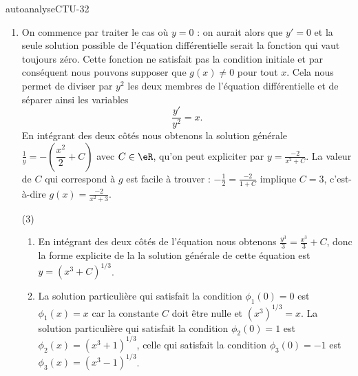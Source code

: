 \begin{corrige}{autoanalyseCTU-32}
\begin{enumerate}
\item On commence par traiter le cas où $y = 0$ : on aurait alors que $y' = 0$ et la seule solution possible de l'équation différentielle serait la fonction qui vaut toujours zéro. Cette fonction ne satisfait pas la condition initiale et par conséquent nous pouvons supposer que $g(x)\neq 0$ pour tout $x$. Cela nous permet de diviser par $y^2$ les deux membres de l'équation différentielle et de séparer ainsi les variables\[
\frac{y'}{y^2} = x. 
\] 
En intégrant des deux c\^otés nous obtenons la solution générale  $\frac{1}{y} =- \left(\dfrac{x^2}{2} + C\right)$ avec $C\in\eR$, qu'on peut expliciter par $y = \frac{-2}{x^2 + C}$. La valeur de $C$ qui correspond à $g$ est facile à trouver : $ -\frac{1}{2} =  \frac{-2}{1 + C}$ implique $C=3$, c'est-à-dire $g(x) = \frac{-2}{x^2 + 3}$.
\item[(3)]
  \begin{enumerate}
  \item En intégrant des deux c\^otés de l'équation nous obtenons  $\displaystyle \frac{y^3}{3}=\frac{x^3}{3}+C$, donc la forme explicite de la la solution générale de cette équation est $\displaystyle y=\left(x^3+C\right)^{1/3}$.
  \item La solution particulière qui satisfait la condition $\phi_1(0)=0$ est $\phi_1(x)=x$ car la constante $C$ doit \^etre nulle et $\left(x^3\right)^{1/3}=x$.
La solution particulière qui satisfait la condition $\phi_2(0)=1$ est $\phi_2(x)=\left(x^3+1\right)^{1/3}$, celle qui satisfait la condition $\phi_3(0)=-1$ est $\phi_3(x)=\left(x^3-1\right)^{1/3}$. 
  \end{enumerate}
\end{enumerate}


\end{corrige}   

